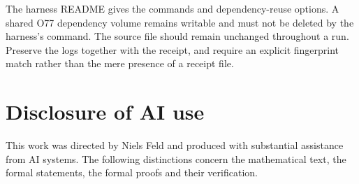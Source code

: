 \documentclass[11pt,a4paper]{article}
\theoremstyle{definition}
\theoremstyle{remark}
\numberwithin{equation}{section}
\begin{document}
The harness README gives the commands and dependency-reuse options. A shared O77 dependency volume remains writable and must not be deleted by the harness's  command. The source file should remain unchanged throughout a run. Preserve the logs together with the receipt, and require an explicit fingerprint match rather than the mere presence of a receipt file.
\section{Disclosure of AI use}\label{sec:ai}

This work was directed by Niels Feld and produced with substantial assistance from AI systems. The following distinctions concern the mathematical text, the formal statements, the formal proofs and their verification.
\end{document}

